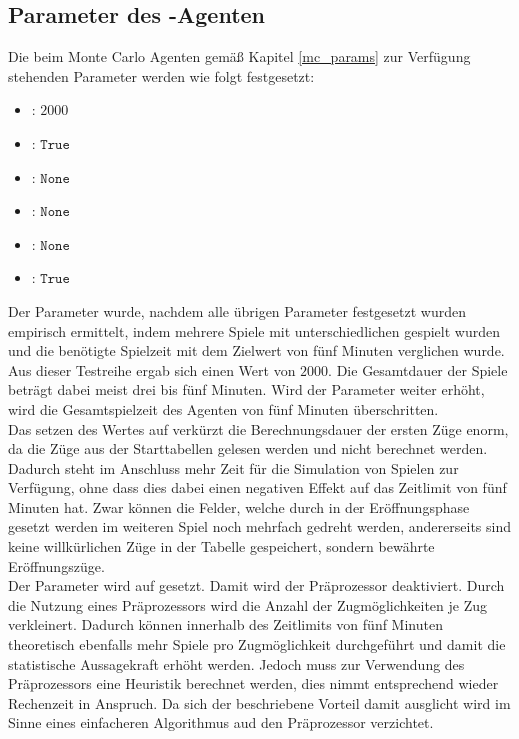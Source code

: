 \subsection{Parameter des -Agenten}
\label{eval:agents:params:subsec-mc}
Die beim Monte Carlo Agenten gemäß Kapitel \ref{mc_params} zur Verfügung stehenden Parameter werden wie folgt festgesetzt:
\begin{itemize}
\item {}: $2000$
\item {}: $\mathtt{True}$
\item {}: $\mathtt{None}$
\item {}: $\mathtt{None}$
\item {}: $\mathtt{None}$
\item {}: $\mathtt{True}$
\end{itemize}
Der Parameter  wurde, nachdem alle übrigen Parameter festgesetzt wurden  empirisch ermittelt, indem mehrere Spiele mit unterschiedlichen  gespielt wurden und die benötigte Spielzeit mit dem Zielwert von fünf Minuten verglichen wurde. Aus dieser Testreihe ergab sich einen  Wert von $2000$. Die Gesamtdauer der Spiele beträgt dabei meist drei bis fünf Minuten. Wird der Parameter weiter erhöht, wird die Gesamtspielzeit des Agenten von fünf Minuten überschritten.
\\Das setzen des Wertes auf  verkürzt die Berechnungsdauer der ersten Züge enorm, da die Züge aus der Starttabellen gelesen werden und nicht berechnet werden. Dadurch steht im Anschluss mehr Zeit für die Simulation von Spielen zur Verfügung, ohne dass dies dabei einen negativen Effekt auf das Zeitlimit von fünf Minuten hat. Zwar können die Felder, welche durch in der Eröffnungsphase gesetzt werden im weiteren Spiel noch mehrfach gedreht werden, andererseits sind keine willkürlichen Züge in der Tabelle gespeichert, sondern bewährte Eröffnungszüge.
\\Der Parameter  wird auf  gesetzt. Damit wird der Präprozessor deaktiviert. Durch die Nutzung eines Präprozessors wird die Anzahl der Zugmöglichkeiten je Zug verkleinert. Dadurch können innerhalb des Zeitlimits von fünf Minuten theoretisch ebenfalls mehr Spiele pro Zugmöglichkeit durchgeführt und damit die statistische Aussagekraft erhöht werden. Jedoch muss zur Verwendung des Präprozessors eine Heuristik berechnet werden, dies nimmt entsprechend wieder Rechenzeit in Anspruch. Da sich der beschriebene Vorteil damit ausglicht wird im Sinne eines einfacheren Algorithmus aud den Präprozessor verzichtet.
